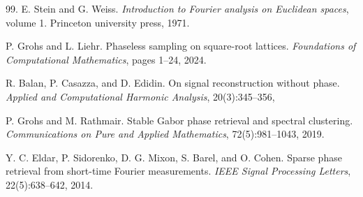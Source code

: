\documentclass[graybox]{svmult}
\begin{document}
\begin{thebibliography}{99.}
E. Stein and G. Weiss.
\newblock \emph{Introduction to {F}ourier analysis on {E}uclidean spaces},
  volume 1.
\newblock Princeton university press, 1971.

P. Grohs and L. Liehr.
\newblock Phaseless sampling on square-root lattices.
\newblock \emph{Foundations of Computational Mathematics}, pages 1--24, 2024.

R. Balan, P. Casazza, and D. Edidin.
\newblock On signal reconstruction without phase.
\newblock \emph{Applied and Computational Harmonic Analysis}, 20(3):345--356,

P. Grohs and M. Rathmair.
\newblock Stable {G}abor phase retrieval and spectral clustering.
\newblock \emph{Communications on Pure and Applied Mathematics}, 72(5):981--1043,
  2019.

Y. C. Eldar, P. Sidorenko, D. G. Mixon, S. Barel, and O. Cohen.
\newblock Sparse phase retrieval from short-time {F}ourier measurements.
\newblock \emph{IEEE Signal Processing Letters}, 22(5):638--642, 2014.
\end{thebibliography}
\end{document}
